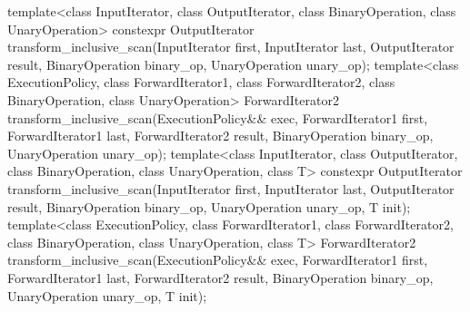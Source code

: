 %
\begin{itemdecl}
template<class InputIterator, class OutputIterator,
         class BinaryOperation, class UnaryOperation>
  constexpr OutputIterator
    transform_inclusive_scan(InputIterator first, InputIterator last,
                             OutputIterator result,
                             BinaryOperation binary_op, UnaryOperation unary_op);
template<class ExecutionPolicy,
         class ForwardIterator1, class ForwardIterator2,
         class BinaryOperation, class UnaryOperation>
  ForwardIterator2
    transform_inclusive_scan(ExecutionPolicy&& exec,
                             ForwardIterator1 first, ForwardIterator1 last,
                             ForwardIterator2 result,
                             BinaryOperation binary_op, UnaryOperation unary_op);
template<class InputIterator, class OutputIterator,
         class BinaryOperation, class UnaryOperation, class T>
  constexpr OutputIterator
    transform_inclusive_scan(InputIterator first, InputIterator last,
                             OutputIterator result,
                             BinaryOperation binary_op, UnaryOperation unary_op,
                             T init);
template<class ExecutionPolicy,
         class ForwardIterator1, class ForwardIterator2,
         class BinaryOperation, class UnaryOperation, class T>
  ForwardIterator2
    transform_inclusive_scan(ExecutionPolicy&& exec,
                             ForwardIterator1 first, ForwardIterator1 last,
                             ForwardIterator2 result,
                             BinaryOperation binary_op, UnaryOperation unary_op,
                             T init);
\end{itemdecl}

